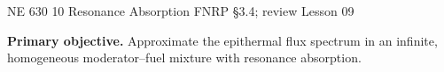 %

\providecommand{\dd}{\,\mathrm{d}}
\usetikzlibrary{arrows.meta}
\setlength{\abovedisplayskip}{4pt plus 1pt minus 1pt}
\setlength{\belowdisplayskip}{4pt plus 1pt minus 1pt}
\setlength{\abovedisplayshortskip}{3pt plus 1pt}
\setlength{\belowdisplayshortskip}{3pt plus 1pt}
\setlength{\jot}{2pt}

\HandoutSetup
  {NE 630}
  {10}
  {Resonance Absorption}
  {FNRP \S3.4; review Lesson 09}


\MakeHandoutTitle

\textcolor{KSUDeepPurple}{\textbf{Primary objective.}}
Approximate the epithermal flux spectrum in an infinite, homogeneous
moderator--fuel mixture with resonance absorption.
\par\vspace{5pt}

